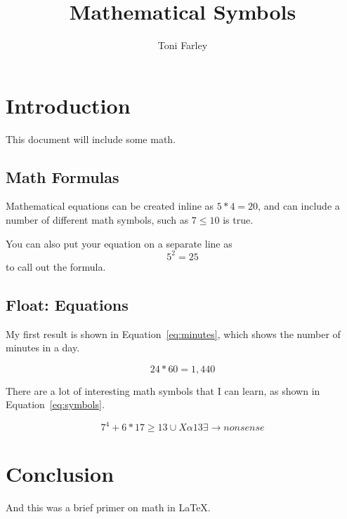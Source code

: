 \documentclass{article}
\title{Mathematical Symbols}
\author{Toni Farley}
\date{}
\begin{document}
\maketitle

\section{Introduction}

This document will include some math.

\subsection{Math Formulas}

Mathematical equations can be created inline as $5*4=20$, and can include a number of different math symbols, such as $7 \leq 10$ is true.

You can also put your equation on a separate line as \[5^2 = 25\] to call out the formula.

\subsection{Float: Equations}

My first result is shown in Equation~\ref{eq:minutes}, which shows the number of minutes in a day.

\begin{equation}
24*60 = 1,440
\label{eq:minutes}
\end{equation}

There are a lot of interesting math symbols that I can learn, as shown in Equation~\ref{eq:symbols}.

\begin{equation}
7^4+6*17 \geq 13 \cup X \alpha 13 \exists \rightarrow nonsense
\label{eq:symbols}
\end{equation}

\section{Conclusion}

And this was a brief primer on math in \LaTeX.
\end{document}
